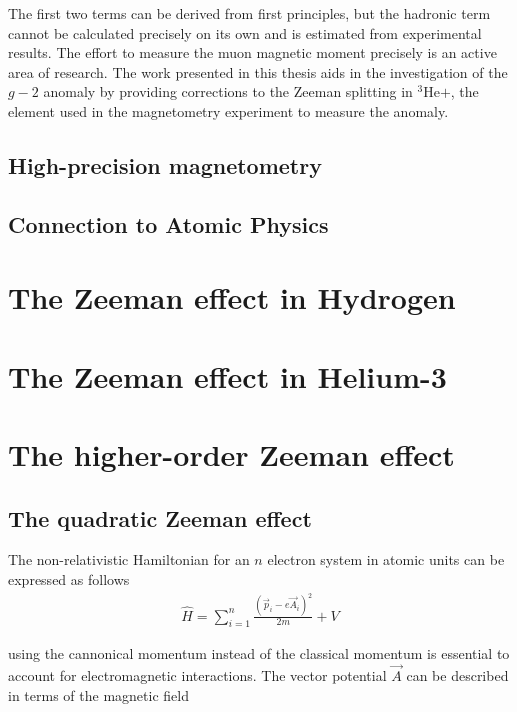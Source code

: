         \noindent The first two terms can be derived from first principles, but the hadronic term cannot be calculated precisely on its own and is estimated from experimental results. The effort to measure the muon magnetic moment precisely is an active area of research. The work presented in this thesis aids in the investigation of the $g-2$ anomaly by providing corrections to the Zeeman splitting in $^3$He$+$, the element used in the magnetometry experiment to measure the anomaly.




        \subsection{High-precision magnetometry}\label{sec:High-Precision-magnetometry}
        \subsection{Connection to Atomic Physics}\label{sec:Connection_To_AMO}
    \section{The Zeeman effect in Hydrogen}\label{sec:Ordinary_Zeeman}
    \section{The Zeeman effect in Helium-3}\label{sec:Ordinary_Zeeman_He3}
    \section{The higher-order Zeeman effect}\label{sec:Higher_Zeeman}
        \subsection{The quadratic Zeeman effect}\label{sec:quadratic_zeeman}
            The non-relativistic Hamiltonian for an $n$ electron system in atomic units can be expressed as follows
            \begin{align}
                \hat{H} = \sum_{i = 1}^n \frac{\left(\vec{p}_i - e\vec{A}_i \right)^2}{2m} + V
            \end{align}

            \noindent using the cannonical momentum instead of the classical momentum is essential to account for electromagnetic interactions. The vector potential $\vec{A}$ can be described in terms of the magnetic field


